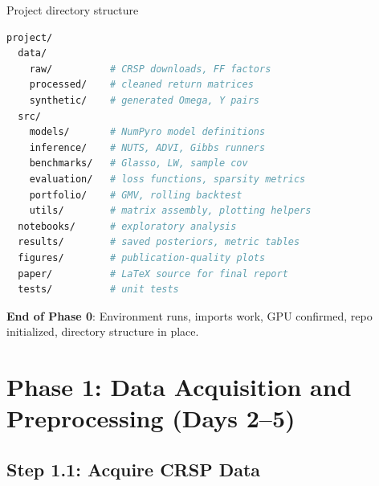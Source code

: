 \documentclass[11pt,a4paper]{article}
\begin{document}
\begin{action}{Project directory structure}
\begin{lstlisting}[language=bash]
project/
  data/
    raw/          # CRSP downloads, FF factors
    processed/    # cleaned return matrices
    synthetic/    # generated Omega, Y pairs
  src/
    models/       # NumPyro model definitions
    inference/    # NUTS, ADVI, Gibbs runners
    benchmarks/   # Glasso, LW, sample cov
    evaluation/   # loss functions, sparsity metrics
    portfolio/    # GMV, rolling backtest
    utils/        # matrix assembly, plotting helpers
  notebooks/      # exploratory analysis
  results/        # saved posteriors, metric tables
  figures/        # publication-quality plots
  paper/          # LaTeX source for final report
  tests/          # unit tests
\end{lstlisting}
\end{action}

\begin{milestone}
\textbf{End of Phase 0}: Environment runs, imports work, GPU confirmed, repo initialized, directory structure in place.
\end{milestone}


\section{Phase 1: Data Acquisition and Preprocessing (Days 2--5)}\label{sec:phase1}

\subsection{Step 1.1: Acquire CRSP Data}
\end{document}
